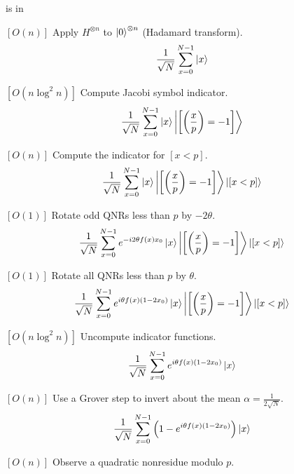\documentclass[final]{beamer}
\providecommand{\QNR}{\csword{QNR}}
\newlength{\colwidth}
\begin{document}
\begin{frame}[t]
\begin{columns}[t]
\begin{column}{\colwidth}
\begin{exampleblock}{\QNR is in \EQPC}
\begin{algorithm}
  \caption{
    Given $p\equiv 1 \bmod 8$, 
  choose least $n$ where $p<2^n=N$. 
    Let $\theta=\mbox{arccos}\left(1-\frac{2^n}{p-1}\right)$, and
    $f(x)=\left[\jacobi{x}{p}=-1\text{ and } 0\le x<p\right]$.
}
  \label{quantum_qnr}
  \begin{noindqlist}
  \item $[O(n)]$ Apply $H^{\otimes n}$ to \( \left| 0 \right\rangle^{\otimes n} \) (Hadamard transform).
    \[ \frac{1}{\sqrt{N}}\sum_{x=0}^{N-1} \left| x \right\rangle \]
  \item $[O(n\log^2 n)]$ Compute Jacobi symbol indicator.
\[\frac{1}{\sqrt{N}} \sum_{x=0}^{N-1} \left| x \right\rangle\left| \left[\left( \displaystyle\frac{x}{p} \right)=-1\right] \right\rangle\]
\item $[O(n)]$ Compute the indicator for $[x<p]$.
\[\frac{1}{\sqrt{N}} \sum_{x=0}^{N-1} \left| x \right\rangle\left| \left[\left( \displaystyle\frac{x}{p} \right)=-1\right] \right\rangle\left| [x<p] \right\rangle\]
  \item $[O(1)]$ Rotate odd QNRs less than $p$ by $-2\theta$.
  \[\frac{1}{\sqrt{N}} \sum_{x=0}^{N-1} e^{-i2\theta f(x)x_0}\left| x \right\rangle\left| \left[\left( \displaystyle\frac{x}{p} \right)=-1\right] \right\rangle\left| [x<p] \right\rangle\]
\item $[O(1)]$ Rotate all QNRs less than $p$ by $\theta$.
  \[\frac{1}{\sqrt{N}} \sum_{x=0}^{N-1} e^{i\theta f(x)(1-2x_0)}\left| x \right\rangle\left| \left[\left( \displaystyle\frac{x}{p} \right)=-1\right] \right\rangle\left| [x<p] \right\rangle\]
\item $[O(n\log^2 n)]$ Uncompute indicator functions.
  \[\frac{1}{\sqrt{N}} \sum_{x=0}^{N-1} e^{i\theta f(x)(1-2x_0)}\left| x \right\rangle\]
\item $[O(n)]$ Use a Grover step to invert about the mean $\alpha=\frac{1}{2\sqrt{N}}$.
    \[ \frac{1}{\sqrt N}\sum_{x=0}^{N-1} \left(1-e^{i\theta f(x) (1-2x_0)}\right)\left| x \right\rangle \]
  \item $[O(n)]$ Observe a quadratic nonresidue modulo $p$.
  \end{noindqlist}
\end{algorithm}


\end{exampleblock}
\end{column}
\end{columns}
\end{frame}
\end{document}
